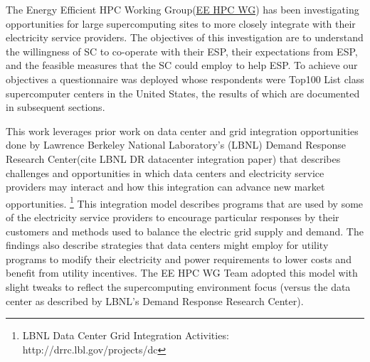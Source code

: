 The Energy Efficient HPC Working Group(\href {http://eehpcwg.lbl.gov/}{EE HPC WG})  has been investigating opportunities for large supercomputing sites to more closely integrate with their electricity service providers.
The objectives of this investigation are to understand the willingness of SC to co-operate with their ESP, their expectations from ESP, and the feasible measures that the SC could employ to help ESP. 
To achieve our objectives a questionnaire was deployed whose respondents were Top100 List class supercomputer centers in the United States, the results of which are documented in subsequent sections.

This work leverages prior work on data center and grid integration opportunities
done by Lawrence Berkeley National Laboratory’s (LBNL) Demand Response Research Center(cite LBNL DR datacenter integration paper)
that describes challenges and opportunities in which data centers and electricity
service providers may interact and how this integration can advance new market opportunities. \footnote{LBNL
Data Center Grid Integration Activities: http://drrc.lbl.gov/projects/dc} 
This integration model describes programs that are used by some of the electricity service providers to encourage particular responses by their customers and methods used to balance the electric grid supply and demand.
The findings also describe strategies that data centers might employ for utility programs to modify their electricity and power requirements to lower costs and benefit from utility incentives. 
The EE HPC WG Team adopted this model with slight tweaks to reflect the supercomputing environment focus 
(versus the data center as described by LBNL's Demand Response Research Center).


